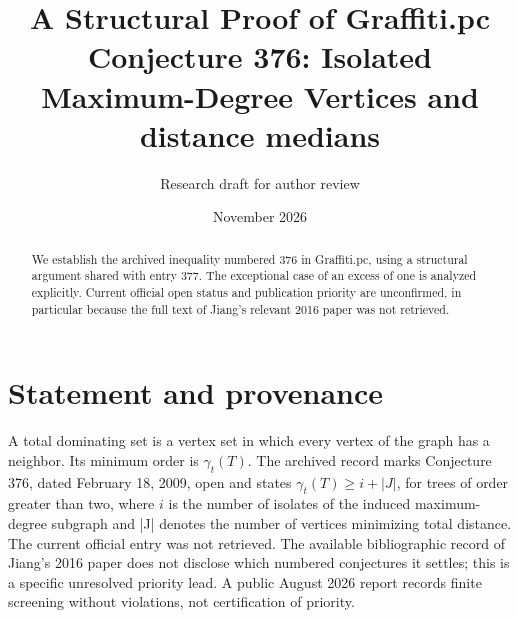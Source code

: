 \documentclass[11pt]{article}
\title{A Structural Proof of Graffiti.pc Conjecture 376: Isolated Maximum-Degree Vertices and distance medians}
\author{Research draft for author review}
\date{November 2026}
\begin{document}
\maketitle
\begin{abstract}
We establish the archived inequality numbered 376 in Graffiti.pc, using a structural argument shared with entry 377. The exceptional case of an excess of one is analyzed explicitly. Current official open status and publication priority are unconfirmed, in particular because the full text of Jiang's relevant 2016 paper was not retrieved.
\end{abstract}
\section{Statement and provenance}
A total dominating set is a vertex set in which every vertex of the graph has a neighbor. Its minimum order is $\gamma_t(T)$. The archived record \cite{archive} marks Conjecture 376, dated February 18, 2009, open and states $\gamma_t(T)\ge i+|J|$, for trees of order greater than two, where $i$ is the number of isolates of the induced maximum-degree subgraph and |J| denotes the number of vertices minimizing total distance. The current official entry \cite{wow} was not retrieved. The available bibliographic record of Jiang's 2016 paper \cite{jiang} does not disclose which numbered conjectures it settles; this is a specific unresolved priority lead. A public August 2026 report \cite{screen} records finite screening without violations, not certification of priority.
\end{document}
